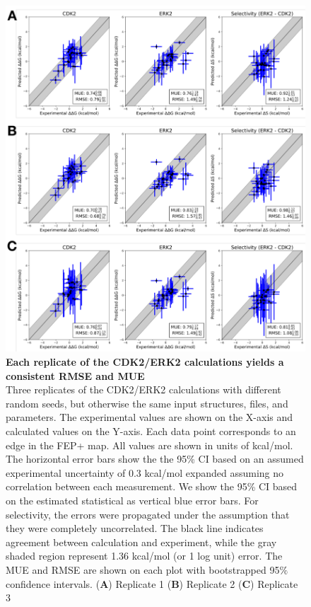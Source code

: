 \documentclass[phd,tocprelim]{cornell}
\begin{document}
\begin{appendices}
	\begin{landscape}
		\begin{figure}[p]
			\centering
			\includegraphics[width=0.46\linewidth]{figures/supp_figure6.pdf}
			\caption[Each replicate of the CDK2/ERK2 calculations yields a consistent RMSE and MUE]{
{\bf Each replicate of the CDK2/ERK2 calculations yields a consistent RMSE and MUE} \\
Three replicates of the CDK2/ERK2 calculations with different random seeds, but otherwise the same input structures, files, and parameters. The experimental values are shown on the X-axis and calculated values on the Y-axis. Each data point corresponds to an edge in the FEP+ map. All values are shown in units of kcal/mol. The horizontal error bars show the the 95\% CI based on an assumed experimental uncertainty of 0.3 kcal/mol\citep{BROWN2009420} expanded assuming no correlation between each measurement. We show the 95\% CI based on the estimated statistical as vertical blue error bars. For selectivity, the errors were propagated under the assumption that they were completely uncorrelated.  The black line indicates agreement between calculation and experiment, while the gray shaded region represent 1.36 kcal/mol (or 1 log unit) error. The MUE and RMSE are shown on each plot with bootstrapped 95$\%$ confidence intervals. ({\bf A}) Replicate 1 ({\bf B}) Replicate 2 ({\bf C}) Replicate 3}
			\label{fig:sup-figure-6}
		\end{figure}
	\end{landscape}
	

\end{appendices}
\end{document}
